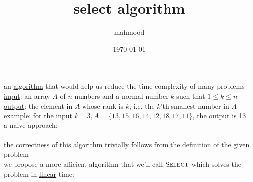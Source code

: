 \documentclass[a4paper,12pt]{article}
\author{mahmood}
\date{\today}
\title{select algorithm}
\begin{document}
\maketitle
an \href{20220706211958-algorithm.org}{algorithm} that would help us reduce the time complexity of many problems\\[0pt]
\uline{input}: an array \(A\) of \(n\) numbers and a normal number \(k\) such that \(1 \le k \le n\)\\[0pt]
\uline{output}: the element in \(A\) whose rank is \(k\), i.e. the \(k\)'th smallest number in \(A\)\\[0pt]
\uline{example}: for the input \(k=3,A=\{13,15,16,14,12,18,17,11\}\), the output is 13\\[0pt]
a naive approach:\\[0pt]
\\[0pt]

the \href{20221104220603-algorithm_correctness.org}{correctness} of this algorithm trivially follows from the definition of the given problem\\[0pt]
we propose a more afficient algorithm that we'll call \(\textsc{Select}\) which solves the problem in \href{calculus2.org}{linear} time:\\[0pt]
\\[0pt]
\end{document}
